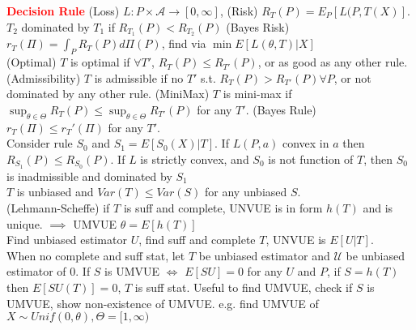 \documentclass{article}
\renewcommand{\section}[1]{\textcolor{red}{\textbf{#1}}}
\renewcommand{\subsection}[1]{\text{\hl{[#1]}}}
\newcommand{\compact}{\\}
\begin{document}
\section{Decision Rule}
 (Loss) $L: P \times \mathcal{A} \rightarrow [0, \infty]$,
(Risk) $R_T(P) = E_P[L(P, T(X)]$.
$T_2$ dominated by $T_1$ if $R_{T_1}(P) < R_{T_2}(P)$
(Bayes Risk) $r_T(\Pi) = \int_P R_T(P) d\Pi(P)$,
find via $\min E[L(\theta, T) | X]$
\compact
\subsection{Decision}
(Optimal) $T$ is optimal if $\forall T'$, $R_T(P) \leq R_{T'}(P)$,
or as good as any other rule.
(Admissibility) $T$ is admissible if no $T'$ s.t. $R_T(P) >
    R_{T'}(P) \forall P$, or not dominated by any other rule.
(MiniMax) $T$ is mini-max if $\sup_{\theta\in\Theta} R_T(P) \leq
    \sup_{\theta\in\Theta} R_{T'}(P)$ for any $T'$.
(Bayes Rule) $r_T(\Pi) \leq r_T'(\Pi)$ for any $T'$.
\compact
\subsection{Rao-Blackwell}
Consider rule $S_0$ and $S_1 = E[S_0(X)|T]$.
If $L(P, a)$ convex in $a$ then $R_{S_1}(P) \leq R_{S_0}(P)$.
If $L$ is strictly convex, and $S_0$ is not function of $T$,
then $S_0$ is inadmissible and dominated by $S_1$
\compact
\subsection{UMVUE}
$T$ is unbiased and $Var(T) \leq Var(S)$ for any unbiased $S$.
\compact
\subsection{Method 1}
(Lehmann-Scheffe) if $T$ is suff and complete, UNVUE is in form $h(T)$ and
is unique. $\implies$ UMVUE $\theta = E[h(T)]$
\compact
\subsection{Method 2}
Find unbiased estimator $U$, find suff and complete $T$,
UNVUE is $E[U|T]$.
\compact
\subsection{Method 3}
When no complete and suff stat, let $T$ be unbiased estimator and
$\mathcal{U}$ be unbiased estimator of $0$.
If $S$ is UMVUE $\Leftrightarrow$ $E[SU] = 0$ for any $U$ and $P$,
if $S=h(T)$ then $E[SU(T)] = 0$, $T$ is suff stat.
Useful to find UMVUE, check if $S$ is UMVUE, show non-existence of
UMVUE. e.g. find UMVUE of $X\sim Unif(0, \theta), \Theta=[1, \infty)$
\compact
\end{document}
